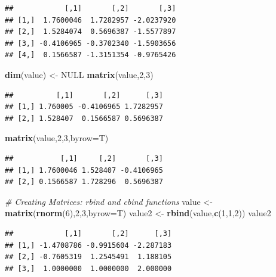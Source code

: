 \documentclass[
]{book}
\newenvironment{Shaded}{\begin{snugshade}}{\end{snugshade}}
\newcommand{\CommentTok}[1]{\textcolor[rgb]{0.56,0.35,0.01}{\textit{#1}}}
\newcommand{\DataTypeTok}[1]{\textcolor[rgb]{0.13,0.29,0.53}{#1}}
\newcommand{\DecValTok}[1]{\textcolor[rgb]{0.00,0.00,0.81}{#1}}
\newcommand{\KeywordTok}[1]{\textcolor[rgb]{0.13,0.29,0.53}{\textbf{#1}}}
\newcommand{\NormalTok}[1]{#1}
\newcommand{\OtherTok}[1]{\textcolor[rgb]{0.56,0.35,0.01}{#1}}
\newcommand{\StringTok}[1]{\textcolor[rgb]{0.31,0.60,0.02}{#1}}
\begin{document}
\begin{verbatim}
##            [,1]       [,2]       [,3]
## [1,]  1.7600046  1.7282957 -2.0237920
## [2,]  1.5284074  0.5696387 -1.5577897
## [3,] -0.4106965 -0.3702340 -1.5903656
## [4,]  0.1566587 -1.3151354 -0.9765426
\end{verbatim}

\begin{Shaded}
\begin{Highlighting}[]
\KeywordTok{dim}\NormalTok{(value) <-}\StringTok{ }\OtherTok{NULL}
\KeywordTok{matrix}\NormalTok{(value,}\DecValTok{2}\NormalTok{,}\DecValTok{3}\NormalTok{)}
\end{Highlighting}
\end{Shaded}

\begin{verbatim}
##          [,1]       [,2]      [,3]
## [1,] 1.760005 -0.4106965 1.7282957
## [2,] 1.528407  0.1566587 0.5696387
\end{verbatim}

\begin{Shaded}
\begin{Highlighting}[]
\KeywordTok{matrix}\NormalTok{(value,}\DecValTok{2}\NormalTok{,}\DecValTok{3}\NormalTok{,}\DataTypeTok{byrow=}\NormalTok{T)}
\end{Highlighting}
\end{Shaded}

\begin{verbatim}
##           [,1]     [,2]       [,3]
## [1,] 1.7600046 1.528407 -0.4106965
## [2,] 0.1566587 1.728296  0.5696387
\end{verbatim}

\begin{Shaded}
\begin{Highlighting}[]
\CommentTok{# Creating Matrices: rbind and cbind functions}
\NormalTok{value <-}\StringTok{ }\KeywordTok{matrix}\NormalTok{(}\KeywordTok{rnorm}\NormalTok{(}\DecValTok{6}\NormalTok{),}\DecValTok{2}\NormalTok{,}\DecValTok{3}\NormalTok{,}\DataTypeTok{byrow=}\NormalTok{T)}
\NormalTok{value2 <-}\StringTok{ }\KeywordTok{rbind}\NormalTok{(value,}\KeywordTok{c}\NormalTok{(}\DecValTok{1}\NormalTok{,}\DecValTok{1}\NormalTok{,}\DecValTok{2}\NormalTok{))}
\NormalTok{value2}
\end{Highlighting}
\end{Shaded}

\begin{verbatim}
##            [,1]       [,2]      [,3]
## [1,] -1.4708786 -0.9915604 -2.287183
## [2,] -0.7605319  1.2545491  1.188105
## [3,]  1.0000000  1.0000000  2.000000
\end{verbatim}
\end{document}

